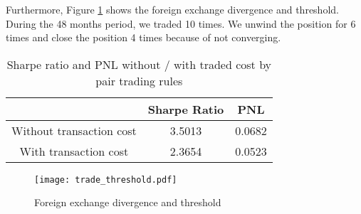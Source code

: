 \documentclass[11pt]{article}
\begin{document}
Furthermore, Figure \ref{trade_threshold} shows the foreign exchange divergence and threshold. During the 48 months period, we traded 10 times. We unwind the position for 6 times and close the position 4 times because of not converging. 
\begin{table}
\centering
\begin{tabular}{ccc}
  \hline
& Sharpe Ratio & PNL \\ 
  \hline
Without transaction cost& 3.5013 &  0.0682\\
With transaction cost&2.3654&0.0523\\
   \hline
\end{tabular}
\caption{Sharpe ratio and PNL without / with traded cost by pair trading rules}\label{pair}
\end{table}
\begin{figure}
\centering
\texttt{[image: trade\_threshold.pdf]}
\caption{ Foreign exchange divergence and threshold}
\label{trade_threshold}
\end{figure}
\end{document}

